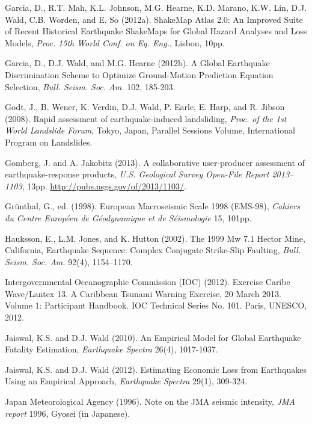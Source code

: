 \documentclass[letterpaper,10pt,english]{sphinxmanual}
\begin{document}
\label{references:garcia2012a}
Garcia, D., R.T. Mah, K.L. Johnson, M.G. Hearne, K.D. Marano, K.W. Lin, D.J. Wald, C.B. Worden, and E.
So (2012a). ShakeMap Atlas 2.0: An Improved Suite of Recent Historical Earthquake
ShakeMaps for Global Hazard Analyses and Loss Models, \emph{Proc. 15th World Conf. on Eq. Eng.},
Lisbon, 10pp.

\label{references:garcia2012b}
Garcia, D., D.J. Wald, and M.G. Hearne (2012b). A Global Earthquake Discrimination Scheme to
Optimize Ground-Motion Prediction Equation Selection, \emph{Bull. Seism. Soc. Am.} 102, 185-203.

\label{references:godt2008}
Godt, J., B. Wener, K. Verdin, D.J. Wald, P. Earle, E. Harp, and R. Jibson (2008). Rapid assessment of
earthquake-induced landsliding, \emph{Proc. of the 1st World Landslide Forum}, Tokyo, Japan, Parallel
Sessions Volume, International Program on Landslides.

\label{references:gomberg2013}
Gomberg, J. and A. Jakobitz (2013). A collaborative user-producer
assessment of earthquake-response products, \emph{U.S. Geological Survey
Open-File Report 2013–1103}, 13pp. \url{http://pubs.usgs.gov/of/2013/1103/}.

\label{references:grunthal1998}
Grünthal, G., ed. (1998). European Macroseismic Scale 1998 (EMS-98), \emph{Cahiers du Centre Européen
de Géodynamique et de Séismologie} 15, 101pp.

Hauksson, E., L.M. Jones, and K. Hutton (2002). The 1999 Mw 7.1 Hector Mine, California,
Earthquake Sequence: Complex Conjugate Strike-Slip Faulting, \emph{Bull. Seism. Soc. Am.}
92(4), 1154–1170.

\label{references:ioc2012}
Intergovernmental Oceanographic Commission (IOC) (2012). Exercise
Caribe Wave/Lantex 13. A Caribbean Tsunami Warning Exercise, 20
March 2013. Volume 1: Participant Handbook. IOC Technical Series No. 101. Paris, UNESCO, 2012.

\label{references:jaiswal2010}
Jaiswal, K.S. and D.J. Wald (2010). An Empirical Model for Global Earthquake Fatality Estimation,
\emph{Earthquake Spectra} 26(4), 1017-1037.

\label{references:jaiswal2012}
Jaiswal, K.S. and D.J. Wald (2012). Estimating Economic Loss from Earthquakes Using an Empirical
Approach, \emph{Earthquake Spectra} 29(1), 309-324.

\label{references:jma1996}
Japan Meteorological Agency (1996). Note on the JMA seismic intensity, \emph{JMA report} 1996, Gyosei (in
Japanese).
\end{document}
